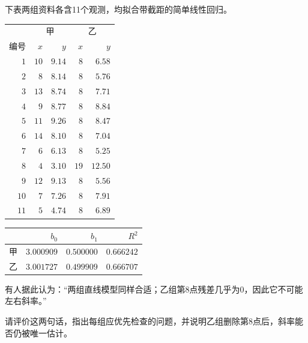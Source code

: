 下表两组资料各含11个观测，均拟合带截距的简单线性回归。\begin{center}\small\setlength{\tabcolsep}{5pt}
\begin{tabular}{rrrrr}
\toprule
 & \multicolumn{2}{c}{甲} & \multicolumn{2}{c}{乙} \\
$\text{编号}$ & $x$ & $y$ & $x$ & $y$ \\
\midrule
$1$ & $10$ & $9.14$ & $8$ & $6.58$ \\
$2$ & $8$ & $8.14$ & $8$ & $5.76$ \\
$3$ & $13$ & $8.74$ & $8$ & $7.71$ \\
$4$ & $9$ & $8.77$ & $8$ & $8.84$ \\
$5$ & $11$ & $9.26$ & $8$ & $8.47$ \\
$6$ & $14$ & $8.10$ & $8$ & $7.04$ \\
$7$ & $6$ & $6.13$ & $8$ & $5.25$ \\
$8$ & $4$ & $3.10$ & $19$ & $12.50$ \\
$9$ & $12$ & $9.13$ & $8$ & $5.56$ \\
$10$ & $7$ & $7.26$ & $8$ & $7.91$ \\
$11$ & $5$ & $4.74$ & $8$ & $6.89$ \\
\bottomrule
\end{tabular}
\end{center}\begin{center}\small\setlength{\tabcolsep}{5pt}
\begin{tabular}{crrr}
\toprule
 & $b_0$ & $b_1$ & $R^2$ \\
\midrule
$\text{甲}$ & $3.000909$ & $0.500000$ & $0.666242$ \\
$\text{乙}$ & $3.001727$ & $0.499909$ & $0.666707$ \\
\bottomrule
\end{tabular}
\end{center}有人据此认为：“两组直线模型同样合适；乙组第8点残差几乎为0，因此它不可能左右斜率。”\par 请评价这两句话，指出每组应优先检查的问题，并说明乙组删除第8点后，斜率能否仍被唯一估计。
